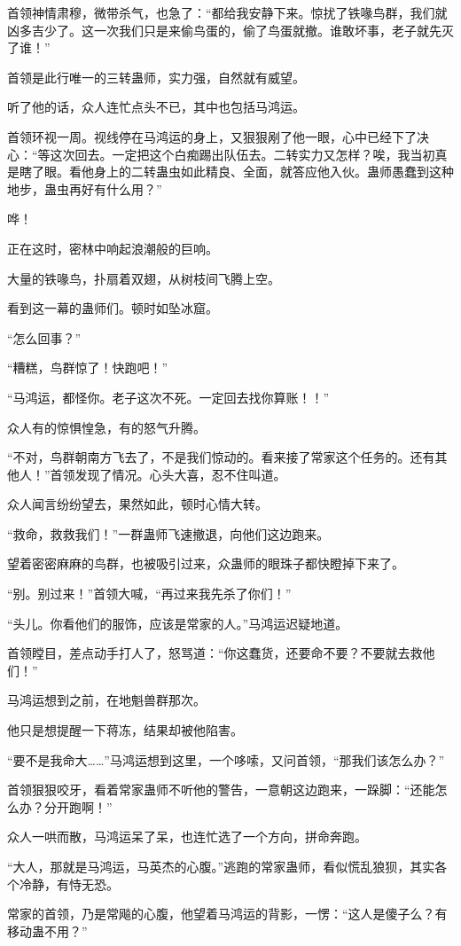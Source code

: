 \begin{this_body}
首领神情肃穆，微带杀气，也急了：“都给我安静下来。惊扰了铁喙鸟群，我们就凶多吉少了。这一次我们只是来偷鸟蛋的，偷了鸟蛋就撤。谁敢坏事，老子就先灭了谁！”

首领是此行唯一的三转蛊师，实力强，自然就有威望。

听了他的话，众人连忙点头不已，其中也包括马鸿运。

首领环视一周。视线停在马鸿运的身上，又狠狠剐了他一眼，心中已经下了决心：“等这次回去。一定把这个白痴踢出队伍去。二转实力又怎样？唉，我当初真是瞎了眼。看他身上的二转蛊虫如此精良、全面，就答应他入伙。蛊师愚蠢到这种地步，蛊虫再好有什么用？”

哗！

正在这时，密林中响起浪潮般的巨响。

大量的铁喙鸟，扑扇着双翅，从树枝间飞腾上空。

看到这一幕的蛊师们。顿时如坠冰窟。

“怎么回事？”

“糟糕，鸟群惊了！快跑吧！”

“马鸿运，都怪你。老子这次不死。一定回去找你算账！！”

众人有的惊惧惶急，有的怒气升腾。

“不对，鸟群朝南方飞去了，不是我们惊动的。看来接了常家这个任务的。还有其他人！”首领发现了情况。心头大喜，忍不住叫道。

众人闻言纷纷望去，果然如此，顿时心情大转。

“救命，救救我们！”一群蛊师飞速撤退，向他们这边跑来。

望着密密麻麻的鸟群，也被吸引过来，众蛊师的眼珠子都快瞪掉下来了。

“别。别过来！”首领大喊，“再过来我先杀了你们！”

“头儿。你看他们的服饰，应该是常家的人。”马鸿运迟疑地道。

首领瞠目，差点动手打人了，怒骂道：“你这蠢货，还要命不要？不要就去救他们！”

马鸿运想到之前，在地魁兽群那次。

他只是想提醒一下蒋冻，结果却被他陷害。

“要不是我命大……”马鸿运想到这里，一个哆嗦，又问首领，“那我们该怎么办？”

首领狠狠咬牙，看着常家蛊师不听他的警告，一意朝这边跑来，一跺脚：“还能怎么办？分开跑啊！”

众人一哄而散，马鸿运呆了呆，也连忙选了一个方向，拼命奔跑。

“大人，那就是马鸿运，马英杰的心腹。”逃跑的常家蛊师，看似慌乱狼狈，其实各个冷静，有恃无恐。

常家的首领，乃是常飚的心腹，他望着马鸿运的背影，一愣：“这人是傻子么？有移动蛊不用？”


\end{this_body}
